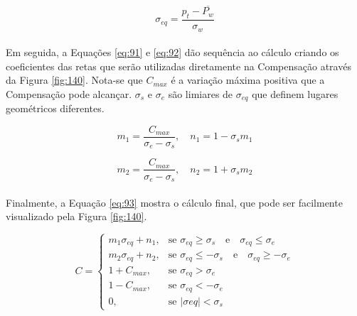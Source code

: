 \begin{equation} \label{eq:90}
    \sigma_{eq} = \dfrac{p_t - \overline{P_w}}{\sigma_w}
\end{equation}

\paragraph{} Em seguida, a Equações \ref{eq:91} e \ref{eq:92} dão sequência ao cálculo criando os coeficientes das retas que serão utilizadas diretamente na Compensação através da Figura \ref{fig:140}. Nota-se que \begin{math} C_{max} \end{math} é a variação máxima positiva que a Compensação pode alcançar. \begin{math} \sigma_s \end{math} e \begin{math} \sigma_e \end{math} são limiares de \begin{math} \sigma_{eq} \end{math} que definem lugares geométricos diferentes.

\begin{equation} \label{eq:91}
    m_1 = \dfrac{ C_{max} }{ \sigma_e - \sigma_s }, \quad n_1 = 1 - \sigma_s m_1
\end{equation}

\begin{equation} \label{eq:92}
    m_2 = \dfrac{ C_{max} }{ \sigma_e - \sigma_s }, \quad n_2 = 1 + \sigma_s m_2
\end{equation}

\paragraph{} Finalmente, a Equação \ref{eq:93} mostra o cálculo final, que pode ser facilmente visualizado pela Figura \ref{fig:140}.

\begin{equation} \label{eq:93}
    C = \begin{cases} m_1 \sigma_{eq} + n_1, & \mbox{se } \sigma_{eq} \ge \sigma_s \quad \textrm{e} \quad \sigma_{eq} \le \sigma_e \\ m_2 \sigma_{eq} + n_2, & \mbox{se } \sigma_{eq} \le - \sigma_s \quad \textrm{e} \quad \sigma_{eq} \ge - \sigma_e \\ 1 + C_{max}, & \mbox{se } \sigma_{eq} > \sigma_e \\ 1 - C_{max}, & \mbox{se } \sigma_{eq} < - \sigma_e \\ 0, & \mbox{se } |\sigma{eq}| < \sigma_s \end{cases}
\end{equation}

